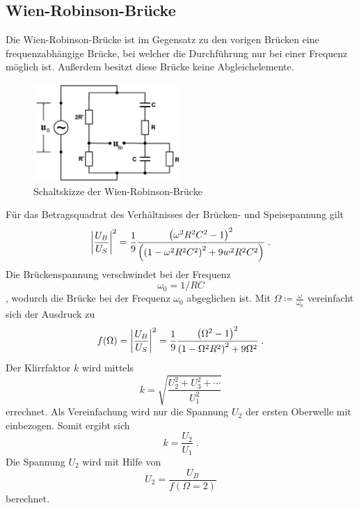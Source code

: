 \subsection{Wien-Robinson-Brücke}
Die Wien-Robinson-Brücke ist im Gegensatz zu den vorigen Brücken eine frequenzabhängige Brücke, bei welcher die Durchführung nur bei einer Frequenz möglich ist.
Außerdem besitzt diese Brücke keine Abgleichelemente.
\begin{figure}
    \centering
    \caption{Schaltskizze der Wien-Robinson-Brücke}
    \label{fig:WR}
    \includegraphics[width=0.5\textwidth]{bridges/WR.png}
\end{figure}
Für das Betragsquadrat des Verhältnisses der Brücken- und Speisepannung gilt
\begin{equation}
    \abs*{\frac{U_B}{U_S}}^2 = \frac{1}{9} \frac{\left(\omega^2 R^2 C^2 -1 \right)^2}{\left( \left( 1 - \omega^2 R^2 C^2 \right)^2 
    + 9 w^2 R^2 C^2 \right)} \; \text{.} \label{eqn:ratioUBUS}
\end{equation}
Die Brückenspannung verschwindet bei der Frequenz 
\begin{equation}
    \omega_0 = 1/RC \label{eqn:omega0}
\end{equation}
, wodurch die Brücke bei der Frequenz $\omega_0$ abgeglichen ist.
Mit $\Omega \coloneq \frac{\omega}{\omega_0}$ vereinfacht sich der Ausdruck zu 
\begin{equation}
    f(\Omega) = \abs*{\frac{U_B}{U_S}}^2 = \frac{1}{9} \frac{\left(\Omega^2 -1 \right)^2}{ \left( 1 - \Omega^2 R^2 \right)^2 
    + 9 \Omega^2} \; \text{.} \label{eqn:fOmega}
\end{equation}
Der Klirrfaktor $k$ wird mittels
\begin{equation}
    k = \sqrt{\frac{U_2^2 + U_3^2 + \dotsb }{U_1^2}} \label{eqn:klirrwhole}
\end{equation}
errechnet. Als Vereinfachung wird nur die Spannung $U_2$ der ersten Oberwelle mit einbezogen. Somit ergibt sich
\begin{equation}
    k = \frac{U_2}{U_1} \; \text{.} \label{eqn:klirreasy}
\end{equation} 
Die Spannung $U_2$ wird mit Hilfe von 
\begin{equation}
    U_2 = \frac{U_B}{f(\Omega = 2)} \label{eqn:U2}
\end{equation}
berechnet.